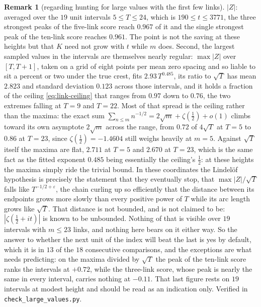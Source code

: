 \documentclass[11pt]{article}
\theoremstyle{definition}
\newtheorem{remark}[theorem]{Remark}
\begin{document}
\begin{remark}[regarding hunting for large values with the first few links]
$|Z|$: averaged over the $19$ unit intervals $5\leq T\leq24$, which is
$190\leq t\leq3771$, the three strongest peaks of the five-link score reach
$0.967$ of it and the single strongest peak of the ten-link score reaches
$0.961$. The point is not the saving at these heights but that $K$ need not grow
with $t$ while $m$ does. Second, the largest sampled values in the intervals
are themselves nearly
regular: $\max|Z|$ over $[T,T+1]$, taken on a grid of eight points per mean
zero spacing and so liable to sit a percent or two under the true crest, fits
$2.93\,T^{0.485}$, its ratio to
$\sqrt{T}$ has mean $2.823$ and standard deviation $0.123$ across those
intervals, and it holds a fraction of the ceiling \eqref{eq:link-ceiling} that
ranges from $0.97$ down to $0.76$, the two extremes falling at $T=9$ and
$T=22$. Most of that spread is the ceiling rather than the maxima: the exact sum
$\sum_{n\leq m}n^{-1/2}=2\sqrt m+\zeta(\tfrac12)+o(1)$ climbs toward its own
asymptote $2\sqrt m$ across the range, from $0.72$ of $4\sqrt T$ at $T=5$ to
$0.86$ at $T=23$, since $\zeta(\tfrac12)=-1.4604$ still weighs heavily at
$m=5$. Against $\sqrt T$ itself the maxima are flat, $2.711$ at $T=5$ and
$2.670$ at $T=23$, which is the same fact as the fitted exponent $0.485$ being
essentially the ceiling's $\tfrac12$: at these heights the maxima simply ride the
trivial bound. In these coordinates the Lindel\"of hypothesis is precisely the
statement that they eventually stop, that $\max|Z|/\sqrt T$ falls like
$T^{-1/2+\varepsilon}$, the chain curling up so efficiently that the distance
between its endpoints grows more slowly than every positive power of $T$ while
its arc length grows like $\sqrt T$. That distance is not bounded, and is not
claimed to be: $|\zeta(\tfrac12+it)|$ is known to be unbounded. Nothing of that is
visible over $19$ intervals with $m\leq23$ links, and nothing here bears on it
either way. So the answer
to whether the next unit of the index will beat the last is yes by default, which
it is in $13$ of the $18$ consecutive comparisons, and the exceptions are what
needs predicting: on the maxima divided by $\sqrt{T}$ the peak of the ten-link
score ranks the intervals at $+0.72$, while the three-link score, whose peak is
nearly the same in every interval, carries nothing at $-0.11$. That last figure
rests on $19$ intervals at modest height and should be read as an indication
only. Verified in \texttt{check\_large\_values.py}.
\end{remark}
\end{document}
